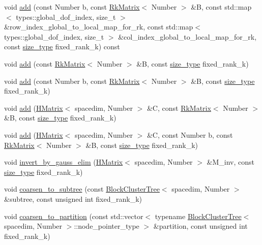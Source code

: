 \begin{DoxyCompactItemize}
\item 
void \hyperlink{classHMatrix_ad3800d6fded523d5c8eeb8fd0c106a34}{add} (const Number b, const \hyperlink{classRkMatrix}{Rk\+Matrix}$<$ Number $>$ \&B, const std\+::map$<$ types\+::global\+\_\+dof\+\_\+index, size\+\_\+t $>$ \&row\+\_\+index\+\_\+global\+\_\+to\+\_\+local\+\_\+map\+\_\+for\+\_\+rk, const std\+::map$<$ types\+::global\+\_\+dof\+\_\+index, size\+\_\+t $>$ \&col\+\_\+index\+\_\+global\+\_\+to\+\_\+local\+\_\+map\+\_\+for\+\_\+rk, const \hyperlink{classHMatrix_a5ca8dc549783d38371a01ecd621ecb34}{size\+\_\+type} fixed\+\_\+rank\+\_\+k) const
\item 
void \hyperlink{classHMatrix_ab9000d7604e2045cf7cad7458daca340}{add} (const \hyperlink{classRkMatrix}{Rk\+Matrix}$<$ Number $>$ \&B, const \hyperlink{classHMatrix_a5ca8dc549783d38371a01ecd621ecb34}{size\+\_\+type} fixed\+\_\+rank\+\_\+k)
\item 
void \hyperlink{classHMatrix_a94981e45b7d9aa0f2afae77d414f1c1a}{add} (const Number b, const \hyperlink{classRkMatrix}{Rk\+Matrix}$<$ Number $>$ \&B, const \hyperlink{classHMatrix_a5ca8dc549783d38371a01ecd621ecb34}{size\+\_\+type} fixed\+\_\+rank\+\_\+k)
\item 
void \hyperlink{classHMatrix_a403d72a5eea3912d67fd0807ddd0baf8}{add} (\hyperlink{classHMatrix}{H\+Matrix}$<$ spacedim, Number $>$ \&C, const \hyperlink{classRkMatrix}{Rk\+Matrix}$<$ Number $>$ \&B, const \hyperlink{classHMatrix_a5ca8dc549783d38371a01ecd621ecb34}{size\+\_\+type} fixed\+\_\+rank\+\_\+k)
\item 
void \hyperlink{classHMatrix_af66071b53145fe007ac040fa0c4b47c6}{add} (\hyperlink{classHMatrix}{H\+Matrix}$<$ spacedim, Number $>$ \&C, const Number b, const \hyperlink{classRkMatrix}{Rk\+Matrix}$<$ Number $>$ \&B, const \hyperlink{classHMatrix_a5ca8dc549783d38371a01ecd621ecb34}{size\+\_\+type} fixed\+\_\+rank\+\_\+k)
\item 
void \hyperlink{classHMatrix_af972cb62d436b8dca5d95a5b6e2ed964}{invert\+\_\+by\+\_\+gauss\+\_\+elim} (\hyperlink{classHMatrix}{H\+Matrix}$<$ spacedim, Number $>$ \&M\+\_\+inv, const \hyperlink{classHMatrix_a5ca8dc549783d38371a01ecd621ecb34}{size\+\_\+type} fixed\+\_\+rank\+\_\+k)
\item 
void \hyperlink{classHMatrix_a27c7390b792e6e47ab2861616a997d99}{coarsen\+\_\+to\+\_\+subtree} (const \hyperlink{classBlockClusterTree}{Block\+Cluster\+Tree}$<$ spacedim, Number $>$ \&subtree, const unsigned int fixed\+\_\+rank\+\_\+k)
\item 
void \hyperlink{classHMatrix_a525ad4d453f4f496b98cccb341c8b60b}{coarsen\+\_\+to\+\_\+partition} (const std\+::vector$<$ typename \hyperlink{classBlockClusterTree}{Block\+Cluster\+Tree}$<$ spacedim, Number $>$\+::node\+\_\+pointer\+\_\+type $>$ \&partition, const unsigned int fixed\+\_\+rank\+\_\+k)

\end{DoxyCompactItemize}
